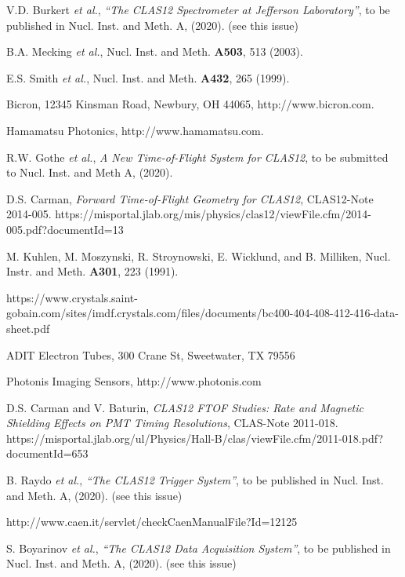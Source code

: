 \documentclass{elsart}
\begin{document}
\begin{thebibliography}{99}

V.D. Burkert {\it et al.}, {\it ``The CLAS12 Spectrometer at Jefferson Laboratory''}, to be published in Nucl. Inst.
and Meth. A, (2020). (see this issue)
  
B.A. Mecking {\it et al.}, Nucl. Inst. and Meth. {\bf A503}, 513 (2003).

E.S. Smith {\it et al.}, Nucl. Inst. and Meth. {\bf A432}, 265 (1999).

Bicron, 12345 Kinsman Road, Newbury, OH 44065, http://www.bicron.com.

Hamamatsu Photonics, http://www.hamamatsu.com.
  
R.W. Gothe {\it et al.}, {\it A New Time-of-Flight System for CLAS12}, to be submitted to Nucl. Inst.
and Meth A, (2020).

D.S. Carman, {\it Forward Time-of-Flight Geometry for CLAS12}, CLAS12-Note 2014-005.
https://misportal.jlab.org/mis/physics/clas12/viewFile.cfm/2014-005.pdf?documentId=13

M. Kuhlen, M. Moszynski, R. Stroynowski, E. Wicklund, and B. Milliken, Nucl.  Instr. and Meth.
{\bf A301}, 223 (1991).

https://www.crystals.saint-gobain.com/sites/imdf.crystals.com/files/documents/bc400-404-408-412-416-data-sheet.pdf

ADIT Electron Tubes, 300 Crane St, Sweetwater, TX 79556
  
Photonis Imaging Sensors, http://www.photonis.com

D.S. Carman and V. Baturin, {\it CLAS12 FTOF Studies: Rate and Magnetic Shielding Effects on PMT Timing
Resolutions}, CLAS-Note 2011-018.\\
https://misportal.jlab.org/ul/Physics/Hall-B/clas/viewFile.cfm/2011-018.pdf?documentId=653

B. Raydo {\it et al.}, {\it ``The CLAS12 Trigger System''}, to be published in Nucl. Inst. and Meth. A, (2020).
(see this issue)
  
http://www.caen.it/servlet/checkCaenManualFile?Id=12125
  
S. Boyarinov {\it et al.}, {\it ``The CLAS12 Data Acquisition System''}, to be published in Nucl. Inst. and Meth. A, (2020).
(see this issue)


\end{thebibliography}
\end{document}
